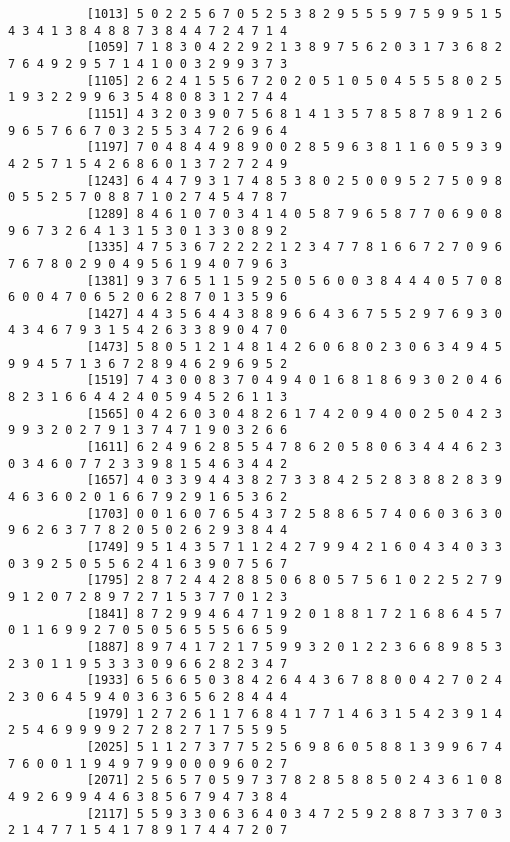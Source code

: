 \documentclass{article}
\begin{document}
\begin{itemize}
\begin{scriptsize}
\begin{verbatim}
		   [1013] 5 0 2 2 5 6 7 0 5 2 5 3 8 2 9 5 5 5 9 7 5 9 9 5 1 5 4 3 4 1 3 8 4 8 8 7 3 8 4 4 7 2 4 7 1 4
		   [1059] 7 1 8 3 0 4 2 2 9 2 1 3 8 9 7 5 6 2 0 3 1 7 3 6 8 2 7 6 4 9 2 9 5 7 1 4 1 0 0 3 2 9 9 3 7 3
		   [1105] 2 6 2 4 1 5 5 6 7 2 0 2 0 5 1 0 5 0 4 5 5 5 8 0 2 5 1 9 3 2 2 9 9 6 3 5 4 8 0 8 3 1 2 7 4 4
		   [1151] 4 3 2 0 3 9 0 7 5 6 8 1 4 1 3 5 7 8 5 8 7 8 9 1 2 6 9 6 5 7 6 6 7 0 3 2 5 5 3 4 7 2 6 9 6 4
		   [1197] 7 0 4 8 4 4 9 8 9 0 0 2 8 5 9 6 3 8 1 1 6 0 5 9 3 9 4 2 5 7 1 5 4 2 6 8 6 0 1 3 7 2 7 2 4 9
		   [1243] 6 4 4 7 9 3 1 7 4 8 5 3 8 0 2 5 0 0 9 5 2 7 5 0 9 8 0 5 5 2 5 7 0 8 8 7 1 0 2 7 4 5 4 7 8 7
		   [1289] 8 4 6 1 0 7 0 3 4 1 4 0 5 8 7 9 6 5 8 7 7 0 6 9 0 8 9 6 7 3 2 6 4 1 3 1 5 3 0 1 3 3 0 8 9 2
		   [1335] 4 7 5 3 6 7 2 2 2 2 1 2 3 4 7 7 8 1 6 6 7 2 7 0 9 6 7 6 7 8 0 2 9 0 4 9 5 6 1 9 4 0 7 9 6 3
		   [1381] 9 3 7 6 5 1 1 5 9 2 5 0 5 6 0 0 3 8 4 4 4 0 5 7 0 8 6 0 0 4 7 0 6 5 2 0 6 2 8 7 0 1 3 5 9 6
		   [1427] 4 4 3 5 6 4 4 3 8 8 9 6 6 4 3 6 7 5 5 2 9 7 6 9 3 0 4 3 4 6 7 9 3 1 5 4 2 6 3 3 8 9 0 4 7 0
		   [1473] 5 8 0 5 1 2 1 4 8 1 4 2 6 0 6 8 0 2 3 0 6 3 4 9 4 5 9 9 4 5 7 1 3 6 7 2 8 9 4 6 2 9 6 9 5 2
		   [1519] 7 4 3 0 0 8 3 7 0 4 9 4 0 1 6 8 1 8 6 9 3 0 2 0 4 6 8 2 3 1 6 6 4 4 2 4 0 5 9 4 5 2 6 1 1 3
		   [1565] 0 4 2 6 0 3 0 4 8 2 6 1 7 4 2 0 9 4 0 0 2 5 0 4 2 3 9 9 3 2 0 2 7 9 1 3 7 4 7 1 9 0 3 2 6 6
		   [1611] 6 2 4 9 6 2 8 5 5 4 7 8 6 2 0 5 8 0 6 3 4 4 4 6 2 3 0 3 4 6 0 7 7 2 3 3 9 8 1 5 4 6 3 4 4 2
		   [1657] 4 0 3 3 9 4 4 3 8 2 7 3 3 8 4 2 5 2 8 3 8 8 2 8 3 9 4 6 3 6 0 2 0 1 6 6 7 9 2 9 1 6 5 3 6 2
		   [1703] 0 0 1 6 0 7 6 5 4 3 7 2 5 8 8 6 5 7 4 0 6 0 3 6 3 0 9 6 2 6 3 7 7 8 2 0 5 0 2 6 2 9 3 8 4 4
		   [1749] 9 5 1 4 3 5 7 1 1 2 4 2 7 9 9 4 2 1 6 0 4 3 4 0 3 3 0 3 9 2 5 0 5 5 6 2 4 1 6 3 9 0 7 5 6 7
		   [1795] 2 8 7 2 4 4 2 8 8 5 0 6 8 0 5 7 5 6 1 0 2 2 5 2 7 9 9 1 2 0 7 2 8 9 7 2 7 1 5 3 7 7 0 1 2 3
		   [1841] 8 7 2 9 9 4 6 4 7 1 9 2 0 1 8 8 1 7 2 1 6 8 6 4 5 7 0 1 1 6 9 9 2 7 0 5 0 5 6 5 5 5 6 6 5 9
		   [1887] 8 9 7 4 1 7 2 1 7 5 9 9 3 2 0 1 2 2 3 6 6 8 9 8 5 3 2 3 0 1 1 9 5 3 3 3 0 9 6 6 2 8 2 3 4 7
		   [1933] 6 5 6 6 5 0 3 8 4 2 6 4 4 3 6 7 8 8 0 0 4 2 7 0 2 4 2 3 0 6 4 5 9 4 0 3 6 3 6 5 6 2 8 4 4 4
		   [1979] 1 2 7 2 6 1 1 7 6 8 4 1 7 7 1 4 6 3 1 5 4 2 3 9 1 4 2 5 4 6 9 9 9 9 2 7 2 8 2 7 1 7 5 5 9 5
		   [2025] 5 1 1 2 7 3 7 7 5 2 5 6 9 8 6 0 5 8 8 1 3 9 9 6 7 4 7 6 0 0 1 1 9 4 9 7 9 9 0 0 0 9 6 0 2 7
		   [2071] 2 5 6 5 7 0 5 9 7 3 7 8 2 8 5 8 8 5 0 2 4 3 6 1 0 8 4 9 2 6 9 9 4 4 6 3 8 5 6 7 9 4 7 3 8 4
		   [2117] 5 5 9 3 3 0 6 3 6 4 0 3 4 7 2 5 9 2 8 8 7 3 3 7 0 3 2 1 4 7 7 1 5 4 1 7 8 9 1 7 4 4 7 2 0 7

\end{verbatim}
\end{scriptsize}
\end{itemize}
\end{document}
